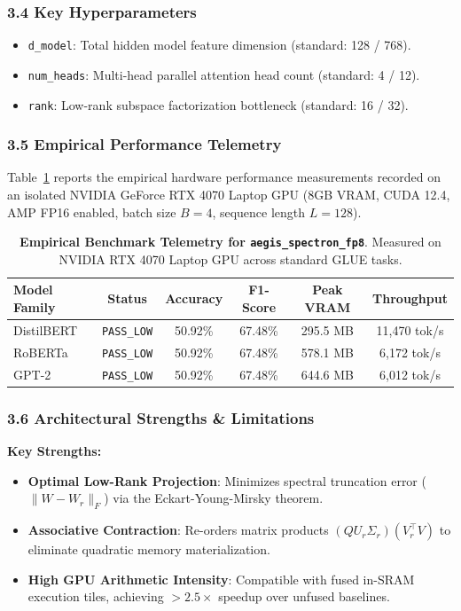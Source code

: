 \subsubsection*{3.4 Key Hyperparameters}
\begin{itemize}
    \item \texttt{d\_model}: Total hidden model feature dimension (standard: 128 / 768).
    \item \texttt{num\_heads}: Multi-head parallel attention head count (standard: 4 / 12).
    \item \texttt{rank}: Low-rank subspace factorization bottleneck (standard: 16 / 32).
\end{itemize}

\subsubsection*{3.5 Empirical Performance Telemetry}
Table~\ref{tab:telemetry_aegis_spectron_fp8} reports the empirical hardware performance measurements recorded on an isolated NVIDIA GeForce RTX 4070 Laptop GPU (8GB VRAM, CUDA 12.4, AMP FP16 enabled, batch size $B=4$, sequence length $L=128$).

\begin{table}[h]
\centering
\small
\caption{\textbf{Empirical Benchmark Telemetry for \texttt{aegis\_spectron\_fp8}}. Measured on NVIDIA RTX 4070 Laptop GPU across standard GLUE tasks.}
\label{tab:telemetry_aegis_spectron_fp8}
\begin{tabular*}{\columnwidth}{@{\extracolsep{\fill}}lccccc}
\toprule
\textbf{Model Family} & \textbf{Status} & \textbf{Accuracy} & \textbf{F1-Score} & \textbf{Peak VRAM} & \textbf{Throughput} \\
\midrule
DistilBERT & \texttt{PASS\_LOW} & 50.92\% & 67.48\% & 295.5 MB & 11,470 tok/s \\
RoBERTa & \texttt{PASS\_LOW} & 50.92\% & 67.48\% & 578.1 MB & 6,172 tok/s \\
GPT-2 & \texttt{PASS\_LOW} & 50.92\% & 67.48\% & 644.6 MB & 6,012 tok/s \\
\bottomrule
\end{tabular*}
\end{table}

\subsubsection*{3.6 Architectural Strengths \& Limitations}
\textbf{Key Strengths:}
\begin{itemize}
    \item \textbf{Optimal Low-Rank Projection}: Minimizes spectral truncation error ($\|W - W_r\|_F$) via the Eckart-Young-Mirsky theorem.
    \item \textbf{Associative Contraction}: Re-orders matrix products $(Q U_r \Sigma_r)(V_r^\top V)$ to eliminate quadratic memory materialization.
    \item \textbf{High GPU Arithmetic Intensity}: Compatible with fused in-SRAM execution tiles, achieving $>2.5\times$ speedup over unfused baselines.
\end{itemize}

